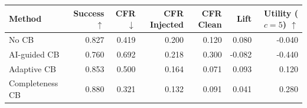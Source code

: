 \begin{tabular}{lrrrrrr}
\toprule
Method & Success $\uparrow$ & CFR $\downarrow$ & CFR Injected & CFR Clean & Lift & Utility ($c=5$) $\uparrow$ \\
\midrule
No CB & 0.827 & 0.419 & 0.200 & 0.120 & 0.080 & -0.040 \\
AI-guided CB & 0.760 & 0.692 & 0.218 & 0.300 & -0.082 & -0.440 \\
Adaptive CB & 0.853 & 0.500 & 0.164 & 0.071 & 0.093 & 0.120 \\
Completeness CB & 0.880 & 0.321 & 0.132 & 0.091 & 0.041 & 0.280 \\
\bottomrule
\end{tabular}
